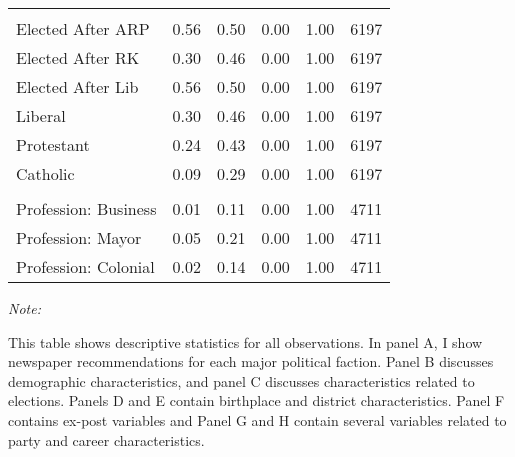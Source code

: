 \begin{table}[!h]
\begin{threeparttable}
\begin{tabular}[t]{lrrrrr}
\addlinespace[0.3em]
\multicolumn{6}{l}{\textbf{Panel G: Party and Career Characteristics}}\\
\hspace{1em}Elected After ARP & \num{0.56} & \num{0.50} & \num{0.00} & \num{1.00} & 6197\\
\hspace{1em}Elected After RK & \num{0.30} & \num{0.46} & \num{0.00} & \num{1.00} & 6197\\
\hspace{1em}Elected After Lib & \num{0.56} & \num{0.50} & \num{0.00} & \num{1.00} & 6197\\
\hspace{1em}Liberal & \num{0.30} & \num{0.46} & \num{0.00} & \num{1.00} & 6197\\
\hspace{1em}Protestant & \num{0.24} & \num{0.43} & \num{0.00} & \num{1.00} & 6197\\
\hspace{1em}Catholic & \num{0.09} & \num{0.29} & \num{0.00} & \num{1.00} & 6197\\
\addlinespace[0.3em]
\multicolumn{6}{l}{\textbf{Panel H: Career Paths}}\\
\hspace{1em}Profession: Business & \num{0.01} & \num{0.11} & \num{0.00} & \num{1.00} & 4711\\
\hspace{1em}Profession: Mayor & \num{0.05} & \num{0.21} & \num{0.00} & \num{1.00} & 4711\\
\hspace{1em}Profession: Colonial & \num{0.02} & \num{0.14} & \num{0.00} & \num{1.00} & 4711\\
\bottomrule
\end{tabular}
\begin{tablenotes}[para]
\item \textit{Note: } 
\item This table shows descriptive statistics for all observations. In panel A, I show newspaper recommendations for each major political faction. Panel B discusses demographic characteristics, and panel C discusses characteristics related to elections. Panels D and E contain birthplace and district characteristics. Panel F contains ex-post variables and Panel G and H contain several variables related to party and career characteristics.
\end{tablenotes}
\end{threeparttable}
\end{table}
